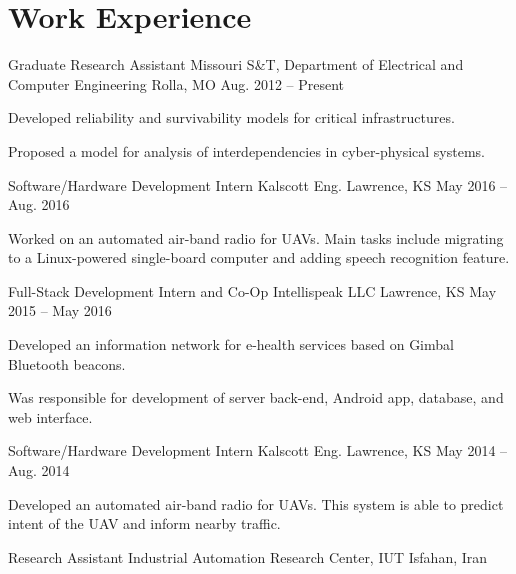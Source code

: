 \section{Work Experience}
\begin{cventries}
  \cventry
    {Graduate Research Assistant}
    {Missouri S\&T, Department of Electrical and Computer Engineering}
    {Rolla, MO}
    {Aug. 2012 -- Present}
    {
      \begin{cvitems}
        \item Developed reliability and survivability models for critical infrastructures.
        \item Proposed a model for analysis of interdependencies in cyber-physical systems.
      \end{cvitems}
    }
  \cventry
    {Software/Hardware Development Intern}
    {Kalscott Eng.}
    {Lawrence, KS}
    {May 2016 -- Aug. 2016}
    {
      \begin{cvitems}
        \item Worked on an automated air-band radio for UAVs. Main tasks include migrating to a Linux-powered single-board computer and adding speech recognition feature.
      \end{cvitems}
    }
  \cventry
    {Full-Stack Development Intern and Co-Op}
    {Intellispeak LLC}
    {Lawrence, KS}
    {May 2015 -- May 2016}
    {
      \begin{cvitems}
        \item Developed an information network for e-health services based on Gimbal Bluetooth beacons.
        \item Was responsible for development of server back-end, Android app, database, and web interface.
      \end{cvitems}
    }
  \cventry
    {Software/Hardware Development Intern}
    {Kalscott Eng.}
    {Lawrence, KS}
    {May 2014 -- Aug. 2014}
    {
      \begin{cvitems}
        \item Developed an automated air-band radio for UAVs. This system is able to predict intent of the UAV and inform nearby traffic.
      \end{cvitems}
    }
  \cventry
    {Research Assistant}
    {Industrial Automation Research Center, IUT}
    {Isfahan, Iran}

\end{cventries}

